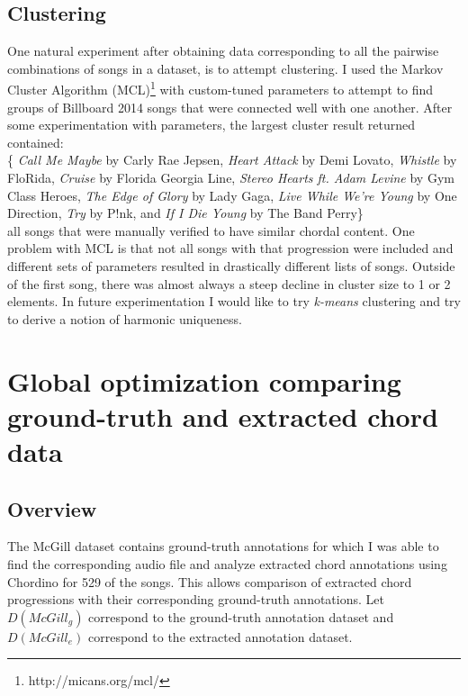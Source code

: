 
\subsection{Clustering}

One natural experiment after obtaining data corresponding to all the pairwise combinations of songs in a dataset, is to attempt clustering. I used the Markov Cluster Algorithm (MCL)\footnote{http://micans.org/mcl/} with custom-tuned parameters to attempt to find groups of Billboard 2014 songs that were connected well with one another. After some experimentation with parameters, the largest cluster result returned contained:\\

\{ \textit{Call Me Maybe} by Carly Rae Jepsen, \textit{Heart Attack} by Demi Lovato, \textit{Whistle} by FloRida, \textit{Cruise} by Florida Georgia Line, \textit{Stereo Hearts ft. Adam Levine} by Gym Class Heroes, \textit{The Edge of Glory} by Lady Gaga, \textit{Live While We're Young} by One Direction, \textit{Try} by P!nk, and \textit{If I Die Young} by The Band Perry\} \\

all songs that were manually verified to have similar chordal content. One problem with MCL is that not all songs with that progression were included and different sets of parameters resulted in drastically different lists of songs. Outside of the first song, there was almost always a steep decline in cluster size to 1 or 2 elements. In future experimentation I would like to try \textit{k-means} clustering and try to derive a notion of harmonic uniqueness.

\section{Global optimization comparing ground-truth and extracted chord data}

\subsection{Overview}

The McGill dataset contains ground-truth annotations for which I was able to find the corresponding audio file and analyze extracted chord annotations using Chordino for 529 of the songs. This allows comparison of extracted chord progressions with their corresponding ground-truth annotations. Let $D({McGill}_{g})$ correspond to the ground-truth annotation dataset and $D({McGill}_{e})$ correspond to the extracted annotation dataset.

